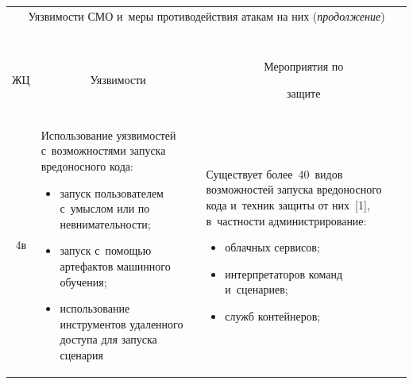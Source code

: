\begin{table}\small  %

\label{s3}

\begin{center}

\tabcolsep=3pt

\begin{tabular}{|c|p{58mm}|p{58mm}|}

\multicolumn{3}{c}{Уязвимости СМО и~меры противодействия атакам на них (\textit{продолжение})}\\

\multicolumn{3}{c}{\ }\\[-6pt]

\hline

ЖЦ&\multicolumn{1}{c|}{Уязвимости}&\multicolumn{1}{c|}{Мероприятия по 

защите}\\

\hline

4в&Использование уязвимостей с~возможностями запуска вредоносного кода:\vspace*{-6pt}

\begin{itemize}

\addtolength{\itemsep}{-6pt}

\item запуск пользователем с~умыслом или по невнимательности;

\item запуск с~помощью артефактов машинного обуче\-ния;

\item использование инструментов удаленного доступа для запуска сценария\vspace*{-6pt}

\end{itemize}&Существует более~40~видов возможностей запуска вредоносного кода и~техник защиты от них~[1], в~частности администрирование:\vspace*{-6pt}

\begin{itemize}

\addtolength{\itemsep}{-6pt}

\item облачных сервисов;

\item интерпретаторов команд и~сценариев;

\item служб контейнеров;


\end{itemize}
\end{tabular}
\end{center}
\end{table}
